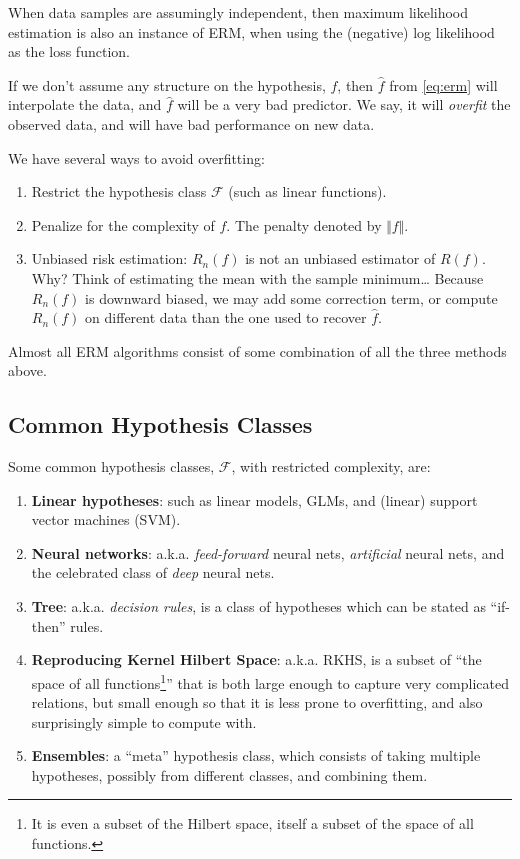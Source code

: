 \documentclass[]{book}
\providecommand{\tightlist}{%
  \setlength{\itemsep}{0pt}\setlength{\parskip}{0pt}}
\theoremstyle{definition}
\theoremstyle{definition}
\theoremstyle{definition}
\theoremstyle{remark}
\begin{document}
When data samples are assumingly independent, then maximum likelihood
estimation is also an instance of ERM, when using the (negative) log
likelihood as the loss function.

If we don't assume any structure on the hypothesis, \(f\), then
\(\hat f\) from \eqref{eq:erm} will interpolate the data, and \(\hat f\)
will be a very bad predictor. We say, it will \emph{overfit} the
observed data, and will have bad performance on new data.

We have several ways to avoid overfitting:

\begin{enumerate}
\def\labelenumi{\arabic{enumi}.}
\tightlist
\item
  Restrict the hypothesis class \(\mathcal{F}\) (such as linear
  functions).
\item
  Penalize for the complexity of \(f\). The penalty denoted by
  \(\Vert f \Vert\).
\item
  Unbiased risk estimation: \(R_n(f)\) is not an unbiased estimator of
  \(R(f)\). Why? Think of estimating the mean with the sample
  minimum\ldots{} Because \(R_n(f)\) is downward biased, we may add some
  correction term, or compute \(R_n(f)\) on different data than the one
  used to recover \(\hat f\).
\end{enumerate}

Almost all ERM algorithms consist of some combination of all the three
methods above.

\subsection{Common Hypothesis Classes}\label{common-hypothesis-classes}

Some common hypothesis classes, \(\mathcal{F}\), with restricted
complexity, are:

\begin{enumerate}
\def\labelenumi{\arabic{enumi}.}
\tightlist
\item
  \textbf{Linear hypotheses}: such as linear models, GLMs, and (linear)
  support vector machines (SVM).
\item
  \textbf{Neural networks}: a.k.a. \emph{feed-forward} neural nets,
  \emph{artificial} neural nets, and the celebrated class of \emph{deep}
  neural nets.
\item
  \textbf{Tree}: a.k.a. \emph{decision rules}, is a class of hypotheses
  which can be stated as ``if-then'' rules.
\item
  \textbf{Reproducing Kernel Hilbert Space}: a.k.a. RKHS, is a subset of
  ``the space of all functions\footnote{It is even a subset of the
    Hilbert space, itself a subset of the space of all functions.}''
  that is both large enough to capture very complicated relations, but
  small enough so that it is less prone to overfitting, and also
  surprisingly simple to compute with.
\item
  \textbf{Ensembles}: a ``meta'' hypothesis class, which consists of
  taking multiple hypotheses, possibly from different classes, and
  combining them.
\end{enumerate}
\end{document}
